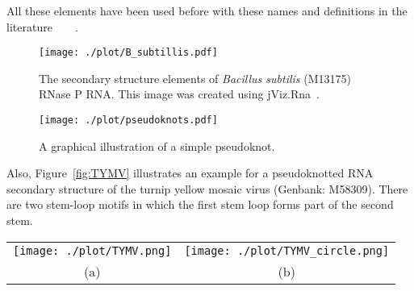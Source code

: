 \documentclass{doublecol-new}
\theoremstyle{TH}{
\newtheorem{lemma}{Lemma}
\newtheorem{theorem}[lemma]{Theorem}
\newtheorem{corrolary}[lemma]{Corrolary}
\newtheorem{conjecture}[lemma]{Conjecture}
\newtheorem{proposition}[lemma]{Proposition}
\newtheorem{claim}[lemma]{Claim}
\newtheorem{stheorem}[lemma]{Wrong Theorem}
\newtheorem{algorithm}{Algorithm}
}
\theoremstyle{THrm}{
\newtheorem{definition}{Definition}
\newtheorem{question}{Question}
\newtheorem{remark}{Remark}
\newtheorem{scheme}{Scheme}
}
\theoremstyle{THhit}{
\newtheorem{case}{Case}[section]
}
\begin{document}
All these elements have been used before with these names and definitions in the
literature~\cite{MathewsSZT99}~\cite{zuker_1999}~\cite{mathews_2006_RNAWorld}~\cite{Andronescu_2003}.
\begin{figure}[h]
  \begin{center}
  \texttt{[image: ./plot/B\_subtillis.pdf]}
  \caption{The secondary structure elements of \textit{Bacillus subtilis} (M13175) RNase P RNA. This
            image was created using jViz.Rna~\cite{wiese_2006_jViz}.}
  \label{fig:B.subtillis}
  \end{center}
\end{figure}

  \begin{figure}[h]
    \begin{center}
      \texttt{[image: ./plot/pseudoknots.pdf]}
      \caption{A graphical illustration of a simple pseudoknot.}
      \label{fig:pseudoknots_mathematical}
    \end{center}
  \end{figure}

Also, Figure~\ref{fig:TYMV} illustrates an example for a pseudoknotted RNA secondary structure
of the turnip yellow mosaic virus (Genbank: M58309). There are two stem-loop motifs in which
the first stem loop forms part of the second stem.

\begin{figure*}
  \begin{center}
    \begin{tabular}{cc}
        \texttt{[image: ./plot/TYMV.png]} &
        \texttt{[image: ./plot/TYMV\_circle.png]} \\
      (a) & (b)  \\
    \end{tabular}
  \end{center}
     \caption{The tRNA-like molecule from the turnip yellow mosaic virus (Genbank: M58309) shown in                (a) a circular Feynman diagram and (b) a secondary structure representation.}
  \label{fig:TYMV}
\end{figure*}
\end{document}
